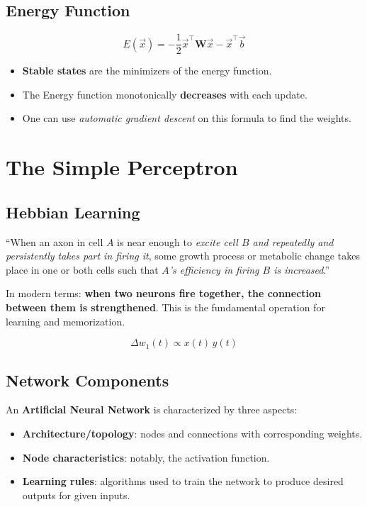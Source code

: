 \documentclass[11pt,a4paper]{article}
\newcommand{\vx}{\vec{x}}
\begin{document}
\subsection{Energy Function}

\begin{theorembox}[title=Energy Function]
\[
E(\vx) = -\frac{1}{2}\vx^\top \mathbf{W}\vx - \vx^\top \vec{b}
\]
\end{theorembox}

\begin{itemize}[leftmargin=*]
    \item \textbf{Stable states} are the minimizers of the energy function.
    \item The Energy function monotonically \textbf{decreases} with each update.
    \item One can use \emph{automatic gradient descent} on this formula to find the weights.
\end{itemize}

\newpage
\section{The Simple Perceptron}

\subsection{Hebbian Learning}

\begin{keybox}[title=Hebb's Postulate (1949)]
``When an axon in cell $A$ is near enough to \emph{excite cell $B$ and repeatedly and persistently takes part in firing it}, some growth process or metabolic change takes place in one or both cells such that \emph{$A$'s efficiency in firing $B$ is increased}.''
\end{keybox}

In modern terms: \textbf{when two neurons fire together, the connection between them is strengthened}. This is the fundamental operation for learning and memorization.

\[
\Delta w_1(t) \propto x(t)\, y(t)
\]

\subsection{Network Components}

An \textbf{Artificial Neural Network} is characterized by three aspects:
\begin{itemize}[leftmargin=*]
    \item \textbf{Architecture/topology}: nodes and connections with corresponding weights.
    \item \textbf{Node characteristics}: notably, the activation function.
    \item \textbf{Learning rules}: algorithms used to train the network to produce desired outputs for given inputs.
\end{itemize}
\end{document}
